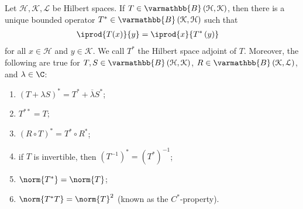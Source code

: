 \documentclass[10pt]{mypackage}
\renewcommand*{\mathbb}[1]{\varmathbb{#1}}
\newcommand{\B}{\mathbb{B}}
\begin{document}
\begin{theorem}
  Let $\mathcal{H}, \mathcal{K},\mathcal{L}$ be Hilbert spaces. If $T\in \B\left(\mathcal{H},\mathcal{K}\right)$, then there is a unique bounded operator $T^{\ast}\in \B\left(\mathcal{K},\mathcal{H}\right)$ such that 
  \begin{align*}
    \iprod{T(x)}{y} &= \iprod{x}{T^{\ast}\left(y\right)}
  \end{align*}
  for all $x\in \mathcal{H}$ and $y\in \mathcal{K}$. We call $T^{\ast}$ the Hilbert space adjoint of $T$. Moreover, the following are true for $T,S\in \B\left(\mathcal{H},\mathcal{K}\right)$, $R\in \B\left(\mathcal{K},\mathcal{L}\right)$, and $\lambda \in \C$:
  \begin{enumerate}[(1)]
    \item $\left(T + \lambda S\right)^{\ast} = T^{\ast} + \overline{\lambda}S^{\ast}$;
    \item $T^{\ast\ast} = T$;
    \item $\left(R\circ T\right)^{\ast} = T^{\ast}\circ R^{\ast}$;
    \item if $T$ is invertible, then $\left(T^{-1}\right)^{\ast} = \left(T^{\ast}\right)^{-1}$;
    \item $\norm{T^{\ast}} = \norm{T}$;
    \item $\norm{T^{\ast}T} = \norm{T}^2$ (known as the $C^{\ast}$-property).
  \end{enumerate}
\end{theorem}
\end{document}
